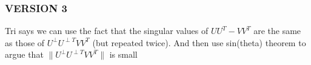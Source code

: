 
\subsubsection{VERSION 3}
Tri says we can use the fact that the singular values of $UU^T-VV^T$ are the same as those of $U^{\perp} U^{\perp T} VV^T$ (but repeated twice).  And then use sin(theta) theorem to argue that $\|U^{\perp} U^{\perp T} VV^T\|$ is small

